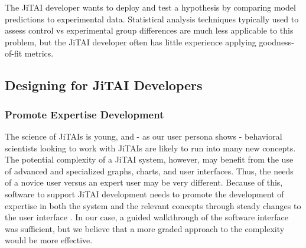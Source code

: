 \documentclass{sigchi}
\begin{document}
The JiTAI developer wants to deploy and test a hypothesis by comparing model predictions to experimental data.
Statistical analysis techniques typically used to assess control vs experimental group differences are much less applicable to this problem, but the JiTAI developer often has little experience applying goodness-of-fit metrics.


\subsection{Designing for JiTAI Developers}

\subsubsection{Promote Expertise Development}
The science of JiTAIs is young, and - as our user persona shows - behavioral scientists looking to work with JiTAIs are likely to run into many new concepts.
The potential complexity of a JiTAI system, however, may benefit from the use of advanced and specialized graphs, charts, and user interfaces. 
Thus, the needs of a novice user versus an expert user may be very different.
Because of this, software to support JiTAI development needs to promote the development of expertise in both the system and the relevant concepts through steady changes to the user interface \cite{cockburn2014supporting}.
In our case, a guided walkthrough of the software interface was sufficient, but we believe that a more graded approach to the complexity would be more effective. 
\end{document}
